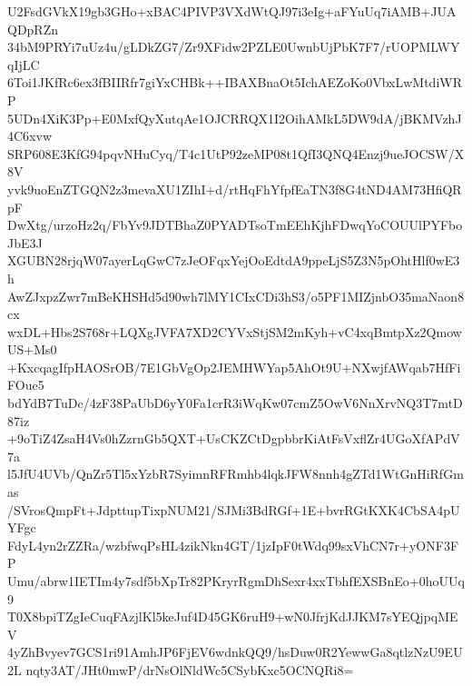 U2FsdGVkX19gb3GHo+xBAC4PIVP3VXdWtQJ97i3eIg+aFYuUq7iAMB+JUAQDpRZn
34bM9PRYi7uUz4u/gLDkZG7/Zr9XFidw2PZLE0UwnbUjPbK7F7/rUOPMLWYqIjLC
6Toi1JKfRc6ex3fBIIRfr7giYxCHBk++IBAXBnaOt5IchAEZoKo0VbxLwMtdiWRP
5UDn4XiK3Pp+E0MxfQyXutqAe1OJCRRQX1I2OihAMkL5DW9dA/jBKMVzhJ4C6xvw
SRP608E3KfG94pqvNHuCyq/T4c1UtP92zeMP08t1QfI3QNQ4Enzj9ueJOCSW/X8V
yvk9uoEnZTGQN2z3mevaXU1ZIhI+d/rtHqFhYfpfEaTN3f8G4tND4AM73HfiQRpF
DwXtg/urzoHz2q/FbYv9JDTBhaZ0PYADTsoTmEEhKjhFDwqYoCOUUlPYFboJbE3J
XGUBN28rjqW07ayerLqGwC7zJeOFqxYejOoEdtdA9ppeLjS5Z3N5pOhtHlf0wE3h
AwZJxpzZwr7mBeKHSHd5d90wh7lMY1CIxCDi3hS3/o5PF1MIZjnbO35maNaon8cx
wxDL+Hbs2S768r+LQXgJVFA7XD2CYVxStjSM2mKyh+vC4xqBmtpXz2QmowUS+Ms0
+KxcqagIfpHAOSrOB/7E1GbVgOp2JEMHWYap5AhOt9U+NXwjfAWqab7HfFiFOue5
bdYdB7TuDc/4zF38PaUbD6yY0Fa1crR3iWqKw07cmZ5OwV6NnXrvNQ3T7mtD87iz
+9oTiZ4ZsaH4Vs0hZzrnGb5QXT+UsCKZCtDgpbbrKiAtFsVxflZr4UGoXfAPdV7a
l5JfU4UVb/QnZr5Tl5xYzbR7SyimnRFRmhb4lqkJFW8nnh4gZTd1WtGnHiRfGmas
/SVrosQmpFt+JdpttupTixpNUM21/SJMi3BdRGf+1E+bvrRGtKXK4CbSA4pUYFgc
FdyL4yn2rZZRa/wzbfwqPsHL4zikNkn4GT/1jzIpF0tWdq99sxVhCN7r+yONF3FP
Umu/abrw1IETIm4y7sdf5bXpTr82PKryrRgmDhSexr4xxTbhfEXSBnEo+0hoUUq9
T0X8bpiTZgIeCuqFAzjlKl5keJuf4D45GK6ruH9+wN0JfrjKdJJKM7sYEQjpqMEV
4yZhBvyev7GCS1ri91AmhJP6FjEV6wdnkQQ9/hsDuw0R2YewwGa8qtlzNzU9EU2L
nqty3AT/JHt0mwP/drNsOlNldWc5CSybKxc5OCNQRi8=
